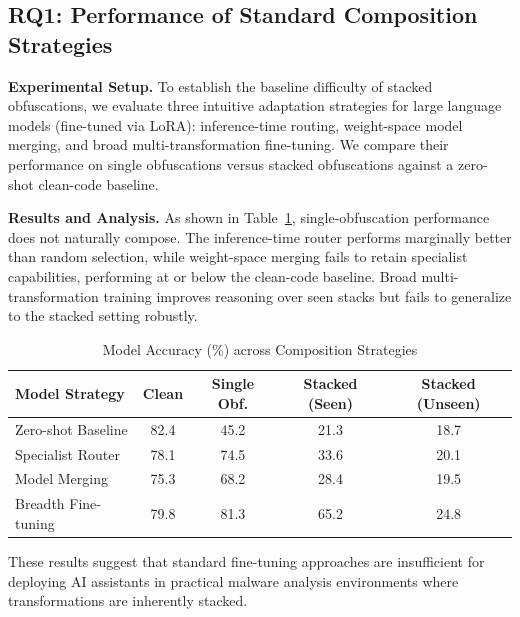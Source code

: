 \subsection{RQ1: Performance of Standard Composition Strategies}
\label{subsec:rq1}

\textbf{Experimental Setup.} To establish the baseline difficulty of stacked obfuscations, we evaluate three intuitive adaptation strategies for large language models (fine-tuned via LoRA): inference-time routing, weight-space model merging, and broad multi-transformation fine-tuning. We compare their performance on single obfuscations versus stacked obfuscations against a zero-shot clean-code baseline.

\textbf{Results and Analysis.} As shown in Table~\ref{tab:rq1_results}, single-obfuscation performance does not naturally compose. The inference-time router performs marginally better than random selection, while weight-space merging fails to retain specialist capabilities, performing at or below the clean-code baseline. Broad multi-transformation training improves reasoning over seen stacks but fails to generalize to the stacked setting robustly. 

\begin{table}[h]
\centering
\caption{Model Accuracy (\%) across Composition Strategies}
\label{tab:rq1_results}
\begin{tabular}{@{}lcccc@{}}
\toprule
\textbf{Model Strategy} & \textbf{Clean} & \textbf{Single Obf.} & \textbf{Stacked (Seen)} & \textbf{Stacked (Unseen)} \\ \midrule
Zero-shot Baseline      & 82.4           & 45.2                 & 21.3                    & 18.7                      \\
Specialist Router       & 78.1           & 74.5                 & 33.6                    & 20.1                      \\
Model Merging           & 75.3           & 68.2                 & 28.4                    & 19.5                      \\
Breadth Fine-tuning     & 79.8           & 81.3                 & 65.2                    & 24.8                      \\ \bottomrule
\end{tabular}
\end{table}

These results suggest that standard fine-tuning approaches are insufficient for deploying AI assistants in practical malware analysis environments where transformations are inherently stacked.